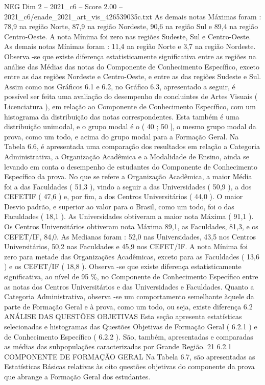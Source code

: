 \begin{textsample}{NEG Dim 2 – 2021\_c6 – Score 2.00 – 2021\_c6/enade\_2021\_art\_vis\_426539035c.txt}
As demais notas Máximas foram : 78,9 na região Norte, 87,9 na região Nordeste, 90,6 na região Sul e 89,4 na região Centro-Oeste.
A nota Mínima foi zero nas regiões Sudeste, Sul e Centro-Oeste.
As demais notas Mínimas foram : 11,4 na região Norte e 3,7 na região Nordeste.
Observa -se que existe diferença estatisticamente significativa entre as regiões na análise das Médias das notas do Componente de Conhecimento Específico, exceto entre as das regiões Nordeste e Centro-Oeste, e entre as das regiões Sudeste e Sul.
Assim como nos Gráficos 6.1 e 6.2, no Gráfico 6.3, apresentado a seguir, é possível ser feita uma avaliação do desempenho de concluintes de Artes Visuais ( Licenciatura ), em relação ao Componente de Conhecimento Específico, com um histograma da distribuição das notas correspondentes.
Esta também é uma distribuição unimodal, e o grupo modal é o ( 40 ; 50 ], o mesmo grupo modal da prova, como um todo, e acima do grupo modal para a Formação Geral.
Na Tabela 6.6, é apresentada uma comparação dos resultados em relação a Categoria Administrativa, a Organização Acadêmica e a Modalidade de Ensino, ainda se levando em conta o desempenho de estudantes do Componente de Conhecimento Específico da prova.
No que se refere a Organização Acadêmica, a maior Média foi a das Faculdades ( 51,3 ), vindo a seguir a das Universidades ( 50,9 ), a dos CEFETIF ( 47,6 ) e, por fim, a dos Centros Universitários ( 44,0 ).
O maior Desvio padrão, e superior ao valor para o Brasil, como um todo, foi o das Faculdades ( 18,1 ).
As Universidades obtiveram a maior nota Máxima ( 91,1 ).
Os Centros Universitários obtiveram nota Máxima 89,1, as Faculdades, 81,3, e os CEFET/IF, 84,0.
As Medianas foram : 52,0 nas Universidades, 43,5 nos Centros Universitários, 50,2 nas Faculdades e 45,9 nos CEFET/IF.
A nota Mínima foi zero para metade das Organizações Acadêmicas, exceto para as Faculdades ( 13,6 ) e os CEFET/IF ( 18,8 ).
Observa -se que existe diferença estatisticamente significativa, ao nível de 95 \%, no Componente de Conhecimento Específico entre as notas dos Centros Universitários e das Universidades e Faculdades.
Quanto a Categoria Administrativa, observa -se um comportamento semelhante àquele da parte de Formação Geral e à prova, como um todo, ou seja, existe diferença 6.2 ANÁLISE DAS QUESTÕES OBJETIVAS Esta seção apresenta estatísticas selecionadas e histogramas das Questões Objetivas de Formação Geral ( 6.2.1 ) e de Conhecimento Específico ( 6.2.2 ).
São, também, apresentadas e comparadas as médias das subpopulações caracterizadas por Grande Região. 21 6.2.1 COMPONENTE DE FORMAÇÃO GERAL Na Tabela 6.7, são apresentadas as Estatísticas Básicas relativas às oito questões objetivas do componente da prova que abrange a Formação Geral dos estudantes.

\end{textsample}
